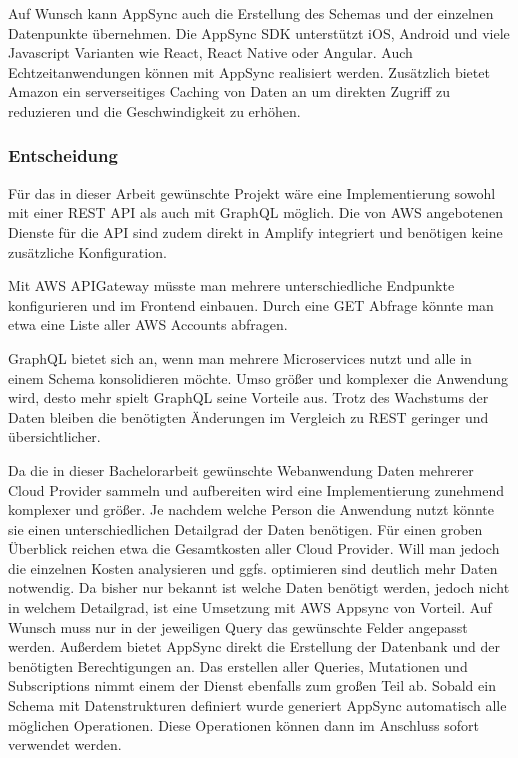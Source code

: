 Auf Wunsch kann AppSync auch die Erstellung des Schemas und der einzelnen Datenpunkte übernehmen.
Die AppSync SDK unterstützt iOS, Android und viele Javascript Varianten wie React, React Native oder Angular.
Auch Echtzeitanwendungen können mit AppSync realisiert werden.
Zusätzlich bietet Amazon ein serverseitiges Caching von Daten an um direkten Zugriff zu reduzieren und die Geschwindigkeit zu erhöhen.
\cite[]{AppSync}



\subsubsection{Entscheidung}
Für das in dieser Arbeit gewünschte Projekt wäre eine Implementierung sowohl mit einer REST API als auch mit GraphQL möglich.
Die von AWS angebotenen Dienste für die API sind zudem direkt in Amplify integriert und benötigen keine zusätzliche Konfiguration.

Mit AWS APIGateway müsste man mehrere unterschiedliche Endpunkte konfigurieren und im Frontend einbauen. Durch eine GET Abfrage könnte man
etwa eine Liste aller AWS Accounts abfragen.

GraphQL bietet sich an, wenn man mehrere Microservices nutzt und alle in einem Schema konsolidieren möchte. Umso größer und komplexer die Anwendung wird, desto
mehr spielt GraphQL seine Vorteile aus. Trotz des Wachstums der Daten bleiben die benötigten Änderungen im Vergleich zu REST geringer und übersichtlicher.

Da die in dieser Bachelorarbeit gewünschte Webanwendung Daten mehrerer Cloud Provider sammeln und aufbereiten wird eine Implementierung zunehmend komplexer und größer.
Je nachdem welche Person die Anwendung nutzt könnte sie einen unterschiedlichen Detailgrad der Daten benötigen. Für einen groben Überblick reichen etwa
die Gesamtkosten aller Cloud Provider. Will man jedoch die einzelnen Kosten analysieren und ggfs. optimieren sind deutlich mehr Daten notwendig.
Da bisher nur bekannt ist welche Daten benötigt werden, jedoch nicht in welchem Detailgrad, ist eine Umsetzung mit AWS Appsync von Vorteil.
Auf Wunsch muss nur in der jeweiligen Query das gewünschte Felder angepasst werden.
Außerdem bietet AppSync direkt die Erstellung der Datenbank und der benötigten Berechtigungen an.
Das erstellen aller Queries, Mutationen und Subscriptions nimmt einem der Dienst ebenfalls zum großen Teil ab. Sobald ein Schema mit Datenstrukturen definiert wurde
generiert AppSync automatisch alle möglichen Operationen. Diese Operationen können dann im Anschluss sofort verwendet werden.

